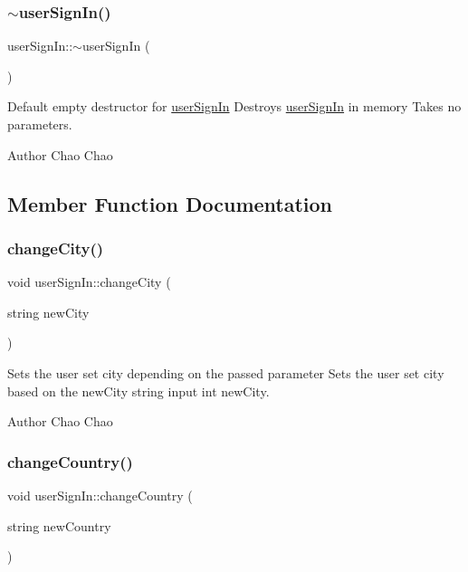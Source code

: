 \subsubsection{\texorpdfstring{$\sim$user\+Sign\+In()}{~userSignIn()}}
{\footnotesize\ttfamily user\+Sign\+In\+::$\sim$user\+Sign\+In (\begin{DoxyParamCaption}{ }\end{DoxyParamCaption})}



Default empty destructor for \mbox{\hyperlink{classuser_sign_in}{user\+Sign\+In}}  Destroys \mbox{\hyperlink{classuser_sign_in}{user\+Sign\+In}} in memory  Takes no parameters. 

\begin{DoxyAuthor}{Author}
Chao Chao 
\end{DoxyAuthor}


\subsection{Member Function Documentation}
\mbox{\label{classuser_sign_in_ab6ad3c051be80088c9ac4df4a48c02c6}} 
\subsubsection{\texorpdfstring{change\+City()}{changeCity()}}
{\footnotesize\ttfamily void user\+Sign\+In\+::change\+City (\begin{DoxyParamCaption}\item[{string}]{new\+City }\end{DoxyParamCaption})}



Sets the user set city depending on the passed parameter  Sets the user set city based on the new\+City string input  int new\+City. 

\begin{DoxyAuthor}{Author}
Chao Chao 
\end{DoxyAuthor}
\mbox{\label{classuser_sign_in_a81a17024250723ca6f6a51417f46db15}} 
\subsubsection{\texorpdfstring{change\+Country()}{changeCountry()}}
{\footnotesize\ttfamily void user\+Sign\+In\+::change\+Country (\begin{DoxyParamCaption}\item[{string}]{new\+Country }\end{DoxyParamCaption})}




